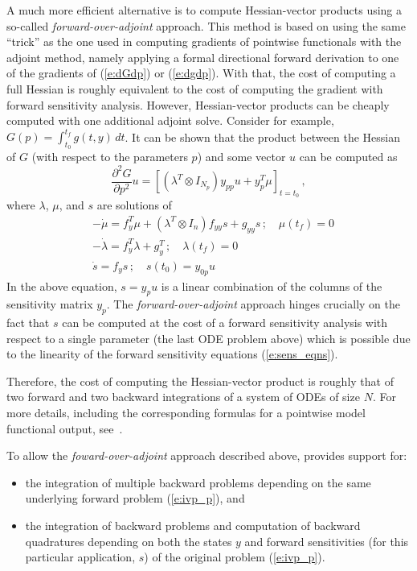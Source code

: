 A much more efficient alternative is to compute Hessian-vector products using
a so-called {\em forward-over-adjoint} approach. This method is based on using
the same ``trick'' as the one used in computing gradients of pointwise
functionals with the adjoint method, namely applying a formal directional forward 
derivation to one of the gradients of (\ref{e:dGdp}) or (\ref{e:dgdp}). With that,
the cost of computing a full Hessian is roughly equivalent to the cost of computing
the gradient with forward sensitivity analysis.  However,
Hessian-vector products can be cheaply computed with one additional adjoint solve.
Consider for example, $G(p) = \int_{t_0}^{t_f} g(t,y) \, dt$.
It can be shown that the product between the Hessian of $G$ (with respect to the 
parameters $p$) and some vector $u$ can be computed as
\begin{equation*}
  \frac{\partial^2 G}{\partial p^2} u = 
  \left[ \left(\lambda^T \otimes I_{N_p} \right) y_{pp}u + y_p^T \mu \right]_{t=t_0} \, ,
\end{equation*}
where $\lambda$, $\mu$, and $s$ are solutions of
\begin{equation}
  \begin{split}
    &-\dot\mu = f_y^T\mu + \left(\lambda^T \otimes I_n \right) f_{yy} s + g_{yy} s\, ; \quad \mu(t_f) = 0 \\
    &-\dot\lambda = f_y^T\lambda + g_y^T \, ; \quad \lambda(t_f) = 0 \\
    &\dot s = f_y s\, ; \quad s(t_0) = y_{0p} u
  \end{split}
\end{equation}
In the above equation, $s = y_p u$ is a linear combination of the columns of the
sensitivity matrix $y_p$.  The {\em forward-over-adjoint} 
approach hinges crucially on the fact that $s$ can be computed at the cost of 
a forward sensitivity analysis with respect to a single parameter (the last 
ODE problem above) which is possible due to the linearity of the forward
sensitivity equations (\ref{e:sens_eqns}).

Therefore, the cost of computing the Hessian-vector product is roughly
that of two forward and two backward integrations of a system of ODEs of size $N$.
For more details, including the corresponding formulas for a pointwise model
functional output, see~\cite{OzBa:05}.

\bigskip

To allow the {\em foward-over-adjoint} approach described above, {\cvodes}
provides support for:
\begin{itemize}
\item the integration of multiple backward problems depending on the same
  underlying forward problem (\ref{e:ivp_p}), and
\item the integration of backward problems and computation of backward quadratures
  depending on both the states $y$ and forward sensitivities (for this particular 
  application, $s$) of the original problem (\ref{e:ivp_p}).
\end{itemize}
